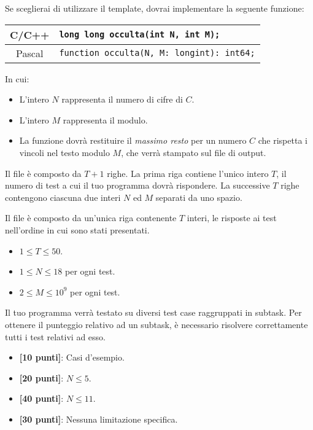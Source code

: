 Se sceglierai di utilizzare il template, dovrai implementare la seguente funzione:
\begin{center}\begin{tabularx}{\textwidth}{|c|X|}
\hline
C/C++  & \verb|long long occulta(int N, int M);|\\
\hline
Pascal & \verb|function occulta(N, M: longint): int64;|\\
\hline
\end{tabularx}\end{center}
In cui:
\begin{itemize}[nolistsep]
  \item L'intero $N$ rappresenta il numero di cifre di $C$.
  \item L'intero $M$ rappresenta il modulo.
  \item La funzione dovrà restituire il \emph{massimo resto} per un numero $C$ che rispetta i vincoli nel testo modulo $M$, che verrà stampato sul file di output.
\end{itemize}

\InputFile
Il file  è composto da $T+1$ righe. La prima riga contiene l'unico intero $T$, il numero di test a cui il tuo programma dovr\`a rispondere. La successive $T$ righe contengono ciascuna due interi $N$ ed $M$ separati da uno spazio.

\OutputFile
Il file \outputfile{} è composto da un'unica riga contenente $T$ interi, le risposte ai test nell'ordine in cui sono stati presentati.

\pagebreak
\Constraints
\begin{itemize}[nolistsep, itemsep=2mm]
	\item $1 \le T \le 50$.
	\item $1 \le N \le 18$ per ogni test.
	\item $2 \le M \le 10^9$ per ogni test.
\end{itemize}

\Scoring
Il tuo programma verrà testato su diversi test case raggruppati in subtask.
Per ottenere il punteggio relativo ad un subtask, è necessario risolvere
correttamente tutti i test relativi ad esso.

\begin{itemize}[nolistsep,itemsep=2mm]
  \item \textbf{ [10 punti]}: Casi d'esempio.
  \item \textbf{ [20 punti]}: $N \leq 5$.
  \item \textbf{ [40 punti]}: $N \leq 11$.
  \item \textbf{ [30 punti]}: Nessuna limitazione specifica.
\end{itemize}

